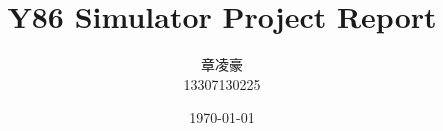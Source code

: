 \documentclass[12pt]{article}
\begin{document}
\pagestyle{fancy}
\lhead{\textbf{{\thetitle}}}
\rhead{\textbf{\nouppercase{\firstleftmark}}}
\cfoot{\thepage}

\title{\textbf{Y86 Simulator Project Report}}
\author{章凌豪\\13307130225}
\date{\today}
\maketitle

\tableofcontents
\clearpage







\end{document}
